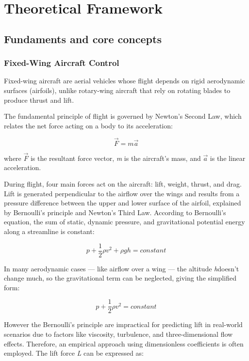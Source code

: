 \chapter{Theoretical Framework}

\section{Fundaments and core concepts}

\subsection{Fixed-Wing Aircraft Control}

Fixed-wing aircraft are aerial vehicles whose flight depends on rigid aerodynamic surfaces (airfoils), unlike rotary-wing aircraft that rely on rotating blades to produce thrust and lift.

The fundamental principle of flight is governed by Newton's Second Law, which relates the net force acting on a body to its acceleration:

\begin{equation}
    \vec{F} = m\vec{a}
\end{equation}

where $\vec{F}$ is the resultant force vector, \textit{m} is the aircraft's mass, and $\vec{a}$ is the linear acceleration.

During flight, four main forces act on the aircraft: lift, weight, thrust, and drag. Lift is generated perpendicular to the airflow over the wings and results from a pressure difference between the upper and lower surface of the airfoil, explained by Bernoulli's principle and Newton's Third Law. According to Bernoulli's equation, the sum of static, dynamic pressure, and gravitational potential energy along a streamline is constant:

\begin{equation}
    p + \frac{1}{2} \rho v^2 + \rho g h = constant
\end{equation}

In many aerodynamic cases — like airflow over a wing — the altitude \textit{h}doesn’t change much, so the gravitational term can be neglected, giving the simplified form:

\begin{equation}
    p + \frac{1}{2} \rho v^2 = constant
\end{equation}

However the Bernoulli's principle are impractical for predicting lift in real-world scenarios due to factors like viscosity, turbulence, and three-dimensional flow effects. Therefore, an empirical approach using dimensionless coefficients is often employed. The lift force \textit{L} can be expressed as:

